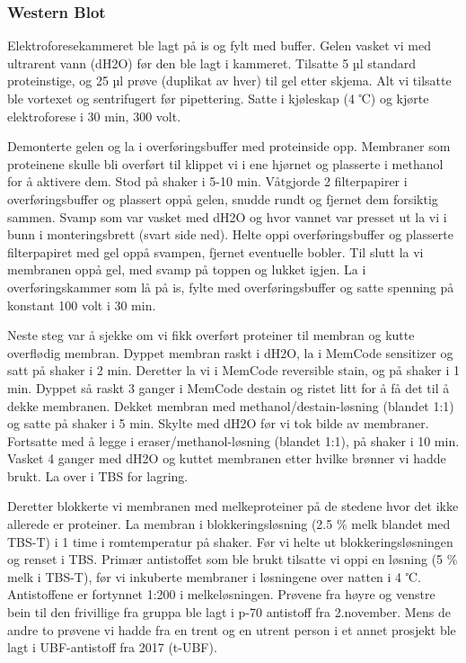 \documentclass[
  letterpaper,
  DIV=11,
  numbers=noendperiod]{scrreprt}
\begin{document}
\hypertarget{western-blot}{%
\subsubsection{\texorpdfstring{\textbf{Western
Blot}}{Western Blot}}\label{western-blot}}

Elektroforesekammeret ble lagt på is og fylt med buffer. Gelen vasket vi
med ultrarent vann (dH2O) før den ble lagt i kammeret. Tilsatte 5 µl
standard proteinstige, og 25 µl prøve (duplikat av hver) til gel etter
skjema. Alt vi tilsatte ble vortexet og sentrifugert før pipettering.
Satte i kjøleskap (4 ℃) og kjørte elektroforese i 30 min, 300 volt.

Demonterte gelen og la i overføringsbuffer med proteinside opp.
Membraner som proteinene skulle bli overført til klippet vi i ene
hjørnet og plasserte i methanol for å aktivere dem. Stod på shaker i
5-10 min. Våtgjorde 2 filterpapirer i overføringsbuffer og plassert oppå
gelen, snudde rundt og fjernet dem forsiktig sammen. Svamp som var
vasket med dH2O og hvor vannet var presset ut la vi i bunn i
monteringsbrett (svart side ned). Helte oppi overføringsbuffer og
plasserte filterpapiret med gel oppå svampen, fjernet eventuelle bobler.
Til slutt la vi membranen oppå gel, med svamp på toppen og lukket igjen.
La i overføringskammer som lå på is, fylte med overføringsbuffer og
satte spenning på konstant 100 volt i 30 min.

Neste steg var å sjekke om vi fikk overført proteiner til membran og
kutte overflødig membran. Dyppet membran raskt i dH2O, la i MemCode
sensitizer og satt på shaker i 2 min. Deretter la vi i MemCode
reversible stain, og på shaker i 1 min. Dyppet så raskt 3 ganger i
MemCode destain og ristet litt for å få det til å dekke membranen.
Dekket membran med methanol/destain-løsning (blandet 1:1) og satte på
shaker i 5 min. Skylte med dH2O før vi tok bilde av membraner. Fortsatte
med å legge i eraser/methanol-løsning (blandet 1:1), på shaker i 10 min.
Vasket 4 ganger med dH2O og kuttet membranen etter hvilke brønner vi
hadde brukt. La over i TBS for lagring.

Deretter blokkerte vi membranen med melkeproteiner på de stedene hvor
det ikke allerede er proteiner. La membran i blokkeringsløsning (2.5 \%
melk blandet med TBS-T) i 1 time i romtemperatur på shaker. Før vi helte
ut blokkeringsløsningen og renset i TBS. Primær antistoffet som ble
brukt tilsatte vi oppi en løsning (5 \% melk i TBS-T), før vi inkuberte
membraner i løsningene over natten i 4 ℃. Antistoffene er fortynnet
1:200 i melkeløsningen. Prøvene fra høyre og venstre bein til den
frivillige fra gruppa ble lagt i p-70 antistoff fra 2.november. Mens de
andre to prøvene vi hadde fra en trent og en utrent person i et annet
prosjekt ble lagt i UBF-antistoff fra 2017 (t-UBF).
\end{document}
